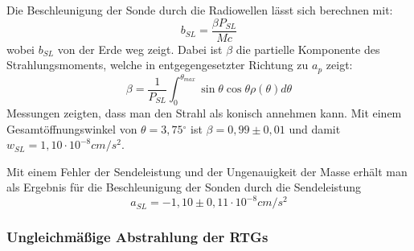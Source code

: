 Die Beschleunigung der Sonde durch die Radiowellen l\"asst sich
berechnen mit:
\begin{equation}
b_{\mathit{SL}}=\frac{\beta P_{\mathit{SL}}}{\mathit{Mc}}
\end{equation}
wobei $b_{\mathit{SL}}$ von der Erde weg zeigt. Dabei ist $\beta $ die
partielle Komponente des Strahlungsmoments, welche in entgegengesetzter
Richtung zu $a_{p}$ zeigt\cite{Anderson2002}:
\begin{equation}
\beta =\frac{1}{P_{\mathit{SL}}}\int _{0}^{\theta _{\mathit{max}}}\sin
\theta \cos \theta \rho (\theta )d\theta
\end{equation}
Messungen  zeigten\cite{Anderson2002}, dass man den Strahl als konisch annehmen kann.
Mit einem Gesamt\"offnungs\-winkel von $\theta =3,75{}^{\circ}$ ist
$\beta =0,99\pm 0,01$ und damit $w_{\mathit{SL}}=1,10\cdot
10^{-8}\mathit{cm}/s^{2}$.

Mit einem Fehler der Sendeleistung und der Ungenauigkeit der Masse
erh\"alt man als Ergebnis f\"ur die Beschleunigung der Sonden durch die
Sendeleistung
\begin{equation}
a_{\mathit{SL}}=-1,10\pm 0,11\cdot 10^{-8}\mathit{cm}/s^{2}
\end{equation}


\newpage 

\subsubsection{Ungleichm\"a{\ss}ige Abstrahlung der RTGs}

